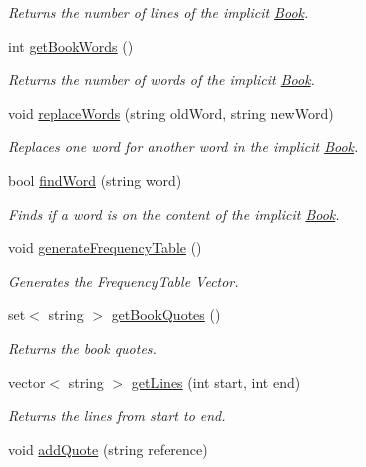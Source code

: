 \begin{DoxyCompactItemize}
\begin{DoxyCompactList}\small\item\em Returns the number of lines of the implicit \hyperlink{class_book}{Book}. \end{DoxyCompactList}\item 
int \hyperlink{class_book_a6f0ccce41fd8db486578e0d325605813}{get\-Book\-Words} ()
\begin{DoxyCompactList}\small\item\em Returns the number of words of the implicit \hyperlink{class_book}{Book}. \end{DoxyCompactList}\item 
void \hyperlink{class_book_aaf182e24b86624b6ff54fba2581094a4}{replace\-Words} (string old\-Word, string new\-Word)
\begin{DoxyCompactList}\small\item\em Replaces one word for another word in the implicit \hyperlink{class_book}{Book}. \end{DoxyCompactList}\item 
bool \hyperlink{class_book_af3ceb5ae5d66adf4d594cac8d29294fc}{find\-Word} (string word)
\begin{DoxyCompactList}\small\item\em Finds if a word is on the content of the implicit \hyperlink{class_book}{Book}. \end{DoxyCompactList}\item 
void \hyperlink{class_book_a8d232eaeb4207707d77bc18e6dd467cd}{generate\-Frequency\-Table} ()
\begin{DoxyCompactList}\small\item\em Generates the Frequency\-Table Vector. \end{DoxyCompactList}\item 
set$<$ string $>$ \hyperlink{class_book_a7e0d6cb0827bc58637da5ba49b4e1944}{get\-Book\-Quotes} ()
\begin{DoxyCompactList}\small\item\em Returns the book quotes. \end{DoxyCompactList}\item 
vector$<$ string $>$ \hyperlink{class_book_acb5eaff231b512901cac3e3220ee2960}{get\-Lines} (int start, int end)
\begin{DoxyCompactList}\small\item\em Returns the lines from start to end. \end{DoxyCompactList}\item 
void \hyperlink{class_book_a97c2374d514327be5d8f74abd0ff4ea3}{add\-Quote} (string reference)

\end{DoxyCompactItemize}

